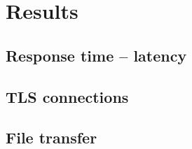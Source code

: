 \chapter{Results}\label{chap:results}

\section{Response time -- latency}

\section{TLS connections}

\section{File transfer}

